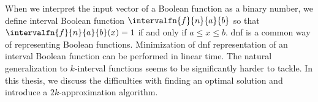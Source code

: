 

When we interpret the input vector of a Boolean function as a binary number,
we define interval Boolean function
$\intervalfn{f}{n}{a}{b}$
so that $\intervalfn{f}{n}{a}{b}(x) = 1$
if and only if $a \leq x \leq b$.
\Acrlong{dnf} is a common way of representing Boolean functions.
Minimization of \acrshort{dnf} representation of an interval Boolean function
can be performed in linear time.
The natural generalization to $k$-interval functions
seems to be significantly harder to tackle.
In this thesis,
we discuss the difficulties with finding an optimal solution
and introduce a $2k$-approximation algorithm.
